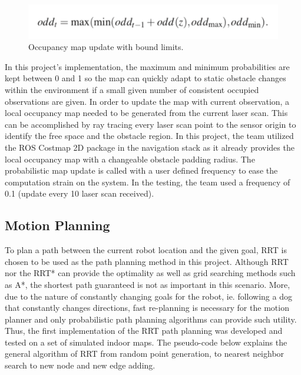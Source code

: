 \documentclass[11pt]{article}
\begin{document}
\begin{figure}[H]
    \centering
        \includegraphics[scale=.5, angle =0]{figures/prob-3.png}
    \caption{Occupancy map update with bound limits.}
    \label{me}
\end{figure}

In this project's implementation, the maximum and minimum probabilities are kept between 0 and 1 so the map can quickly adapt to static obstacle changes within the environment if a small given number of consistent occupied observations are given. 
In order to update the map with current observation, a local occupancy map needed to be generated from the current laser scan. This can be accomplished by ray tracing every laser scan point to the sensor origin to identify the free space and the obstacle region. In this project, the team utilized the ROS Costmap 2D package in the navigation stack as it already provides the local occupancy map with a changeable obstacle padding radius. The probabilistic map update is called with a user defined frequency to ease the computation strain on the system. In the testing, the team used a frequency of 0.1 (update every 10 laser scan received).


\subsection{Motion Planning}
To plan a path between the current robot location and the given goal, RRT is chosen to be used as the path planning method in this project. Although RRT nor the RRT* can provide the optimality as well as grid searching methods such as A*, the shortest path guaranteed is not as important in this scenario. More, due to the nature of constantly changing goals for the robot, ie. following a dog that constantly changes directions, fast re-planning is necessary for the motion planner and only probabilistic path planning algorithms can provide such utility. Thus, the first implementation of the RRT path planning was developed and tested on a set of simulated indoor maps. The pseudo-code below explains the general algorithm of RRT from random point generation, to nearest neighbor search to new node and new edge adding. 
\end{document}
